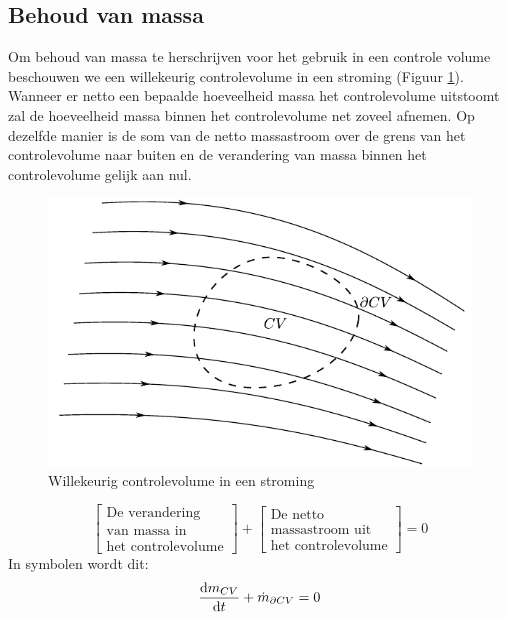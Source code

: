 			\subsection{Behoud van massa}
			\label{sec:Behoud van massa}
Om behoud van massa te herschrijven voor het gebruik in een controle volume beschouwen we een willekeurig controlevolume in een stroming (Figuur \ref{fig:controlevolume in stroming}). Wanneer er netto een bepaalde hoeveelheid massa het controlevolume uitstoomt zal de hoeveelheid massa binnen het controlevolume net zoveel afnemen. Op dezelfde manier is de som van de netto massastroom over de grens van het controlevolume naar buiten en de verandering van massa binnen het controlevolume gelijk aan nul.
\begin{figure}[htb]
	\centering
	\includegraphics{fig/controlevolumes/Controlevolume_met_stroomlijnen}
	\caption{Willekeurig controlevolume in een stroming}
	\label{fig:controlevolume in stroming}
\end{figure}
\begin{equation}
	\left[
		\begin{array}{c}
			\mbox{De verandering} \\ \mbox{van massa in} \\ \mbox{het controlevolume}
		\end{array}
	\right]
	+
	\left[
		\begin{array}{c}
			\mbox{De netto} \\ \mbox{massastroom uit} \\ \mbox{het controlevolume}
		\end{array}
	\right]
	= 0
	\label{eqn:controlevolume,behoud van massa,woorden}
\end{equation}
In symbolen wordt dit:
\begin{equation}
	\frac{\mathrm{d} m_{CV}}{\mathrm{d} t} + \dot{m}_{\partial CV} = 0
	\label{eqn:controlevolume,behoud van massa}
\end{equation}

